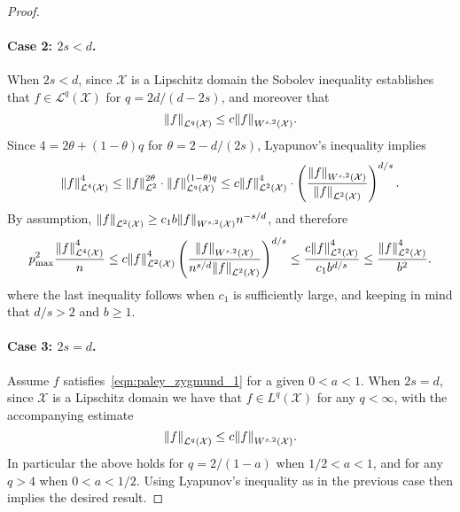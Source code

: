 \documentclass{article}
\newcommand{\1}{\mathbf{1}}
\newcommand{\Xset}{\mathcal{X}}
\newcommand{\Leb}{\mathcal{L}}
\theoremstyle{alden}
\theoremstyle{aldenthm}
\theoremstyle{definition}
\theoremstyle{remark}
\begin{document}
\begin{proof}
	\paragraph{Case 2: $2s < d$.}
	When $2s < d$, since $\Xset$ is a Lipschitz domain the Sobolev inequality establishes that $f \in \Leb^q(\Xset)$ for $q = 2d/(d - 2s)$, and moreover that
	\begin{equation*}
	\norm{f}_{\Leb^q(\Xset)} \leq c \norm{f}_{W^{s,2}(\Xset)}.
	\end{equation*}
	Since $4 = 2\theta + (1 - \theta)q$ for $\theta = 2 - d/(2s)$, Lyapunov's inequality implies
	\begin{equation*}
	\norm{f}_{\Leb^4(\Xset)}^4 \leq \norm{f}_{\Leb^2}^{2\theta} \cdot \norm{f}_{\Leb^q(\Xset)}^{(1 - \theta)q} \leq c \norm{f}_{\Leb^2(\Xset)}^{4} \cdot \left(\frac{\norm{f}_{W^{s,2}(\Xset)}}{\norm{f}_{\Leb^2(\Xset)}}\right)^{d/s}.
	\end{equation*}
	By assumption, $\norm{f}_{\Leb^2(\Xset)} \geq c_1 b \norm{f}_{W^{s,2}(\Xset)} n^{-s/d}$, and therefore
	\begin{equation*}
	p_{\max}^2 \frac{\norm{f}_{\Leb^4(\Xset)}^4}{n} \leq c\norm{f}_{\Leb^2(\Xset)}^4 \left(\frac{\norm{f}_{W^{s,2}(\Xset)}}{n^{s/d}\norm{f}_{\Leb^2(\Xset)}}\right)^{d/s} \leq \frac{c\norm{f}_{\Leb^2(\Xset)}^4}{c_1b^{d/s}} \leq \frac{\norm{f}_{\Leb^2(\Xset)}^4}{b^2}.
	\end{equation*}
	where the last inequality follows when $c_1$ is sufficiently large, and keeping in mind that $d/s > 2$ and $b \geq 1$. 
	
	\paragraph{Case 3: $2s = d$.}
	Assume $f$ satisfies~\eqref{eqn:paley_zygmund_1} for a given $0 < a < 1$. When $2s = d$, since $\Xset$ is a Lipschitz domain we have that $f \in L^q(\Xset)$ for any $q < \infty$, with the accompanying estimate
	\begin{equation*}
	\norm{f}_{\Leb^q(\Xset)} \leq c \norm{f}_{W^{s,2}(\Xset)}.
	\end{equation*}
	In particular the above holds for $q = 2/(1 - a)$ when $1/2 < a < 1$, and for any $q > 4$ when $0 < a < 1/2$. Using Lyapunov's inequality as in the previous case then implies the desired result.
\end{proof}
\end{document}
